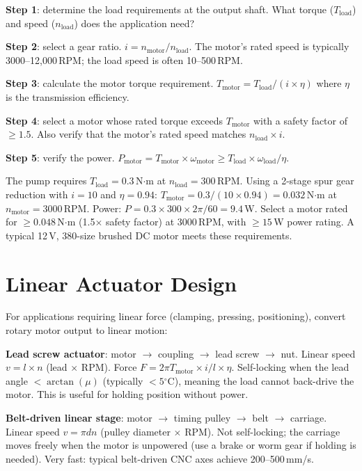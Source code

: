 \documentclass[11pt,letterpaper,twoside,openany]{book}
\newcommand{\degC}{\ensuremath{{}^{\circ}\text{C}}}
\begin{document}
\textbf{Step 1}: determine the load requirements at the output shaft. What torque ($T_{\text{load}}$) and speed ($n_{\text{load}}$) does the application need?

\textbf{Step 2}: select a gear ratio. $i = n_{\text{motor}}/n_{\text{load}}$. The motor's rated speed is typically 3000--12{,}000\,RPM; the load speed is often 10--500\,RPM.

\textbf{Step 3}: calculate the motor torque requirement. $T_{\text{motor}} = T_{\text{load}} / (i \times \eta)$ where $\eta$ is the transmission efficiency.

\textbf{Step 4}: select a motor whose rated torque exceeds $T_{\text{motor}}$ with a safety factor of $\geq 1.5$. Also verify that the motor's rated speed matches $n_{\text{load}} \times i$.

\textbf{Step 5}: verify the power. $P_{\text{motor}} = T_{\text{motor}} \times \omega_{\text{motor}} \geq T_{\text{load}} \times \omega_{\text{load}} / \eta$.

\begin{greenshieldbox}
The pump requires $T_{\text{load}} = 0.3$\,N$\cdot$m at $n_{\text{load}} = 300$\,RPM. Using a 2-stage spur gear reduction with $i = 10$ and $\eta = 0.94$: $T_{\text{motor}} = 0.3/(10 \times 0.94) = 0.032$\,N$\cdot$m at $n_{\text{motor}} = 3000$\,RPM. Power: $P = 0.3 \times 300 \times 2\pi/60 = 9.4$\,W. Select a motor rated for $\geq 0.048$\,N$\cdot$m (1.5$\times$ safety factor) at 3000\,RPM, with $\geq 15$\,W power rating. A typical 12\,V, 380-size brushed DC motor meets these requirements.
\end{greenshieldbox}

\section{Linear Actuator Design}
For applications requiring linear force (clamping, pressing, positioning), convert rotary motor output to linear motion:

\textbf{Lead screw actuator}: motor $\to$ coupling $\to$ lead screw $\to$ nut. Linear speed $v = l \times n$ (lead $\times$ RPM). Force $F = 2\pi T_{\text{motor}} \times i / l \times \eta$. Self-locking when the lead angle $< \arctan(\mu)$ (typically $< 5$\degC{}), meaning the load cannot back-drive the motor. This is useful for holding position without power.

\textbf{Belt-driven linear stage}: motor $\to$ timing pulley $\to$ belt $\to$ carriage. Linear speed $v = \pi d n$ (pulley diameter $\times$ RPM). Not self-locking; the carriage moves freely when the motor is unpowered (use a brake or worm gear if holding is needed). Very fast: typical belt-driven CNC axes achieve 200--500\,mm/s.
\end{document}
